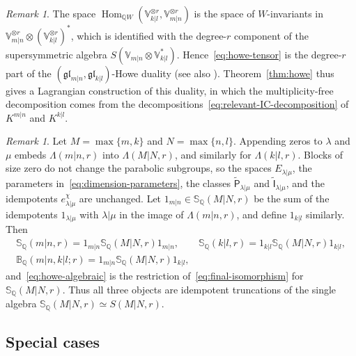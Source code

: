 \documentclass[11pt,a4paper]{amsart}
\theoremstyle{definition}
\theoremstyle{remark}
\newtheorem{remark}[theorem]{Remark}
\newcommand{\Q}{\mathbb Q}
\newcommand{\bS}{\mathbb S}
\newcommand{\bB}{\mathbb B}
\newcommand{\Hom}{\operatorname{Hom}}
\newcommand{\lm}{\lambda|\mu}
\numberwithin{equation}{section}
\begin{document}
\begin{remark}\label{rem:howe-classical}
The space $\Hom_{\Q W}(\mathbb V_{k|l}^{\otimes r},\mathbb V_{m|n}^{\otimes r})$
is the space of $W$-invariants in
$\mathbb V_{m|n}^{\otimes r}\otimes(\mathbb V_{k|l}^{\otimes r})^*$, which
is identified with the degree-$r$ component of the supersymmetric algebra
$S(\mathbb V_{m|n}\otimes\mathbb V_{k|l}^*)$. Hence~\eqref{eq:howe-tensor}
is the degree-$r$ part of the $(\mathfrak{gl}_{m|n},\mathfrak{gl}_{k|l})$-Howe
duality \cite{How89,CW01} (see also \cite[Chapter~5]{CW12}).
Theorem~\ref{thm:howe} thus gives a Lagrangian construction of this
duality, in which the multiplicity-free decomposition comes from the
decompositions~\eqref{eq:relevant-IC-decomposition} of $K^{m|n}$ and
$K^{k|l}$.
\end{remark}

\begin{remark}\label{rem:howe-padding}
Let $M=\max\{m,k\}$ and $N=\max\{n,l\}$. Appending zeros to $\lambda$ and
$\mu$ embeds $\Lambda(m|n,r)$ into $\Lambda(M|N,r)$, and similarly for
$\Lambda(k|l,r)$. Blocks of size zero do not change the parabolic
subgroups, so the spaces $E_{\lm}$, the parameters
in~\eqref{eq:dimension-parameters}, the classes
$\widetilde{\mathsf P}_{\lm}$ and $\widetilde{\mathsf I}_{\lm}$, and the
idempotents $e^\chi_{\lm}$ are unchanged. Let $1_{m|n}\in\bS_\Q(M|N,r)$ be the
sum of the idempotents $1_{\lm}$ with $\lm$ in the image of
$\Lambda(m|n,r)$, and define $1_{k|l}$ similarly. Then
$$
\begin{gathered}
\bS_\Q(m|n,r)=1_{m|n}\bS_\Q(M|N,r)1_{m|n},\qquad
\bS_\Q(k|l,r)=1_{k|l}\bS_\Q(M|N,r)1_{k|l},\\
\bB_\Q(m|n,k|l;r)=1_{m|n}\bS_\Q(M|N,r)1_{k|l},
\end{gathered}
$$
and~\eqref{eq:howe-algebraic} is the restriction
of~\eqref{eq:final-isomorphism} for $\bS_\Q(M|N,r)$. Thus all three objects are
idempotent truncations of the single algebra
$\bS_\Q(M|N,r)\simeq S(M|N,r)$.
\end{remark}

\subsection{Special cases}
\label{sec:howe-special}
\end{document}
